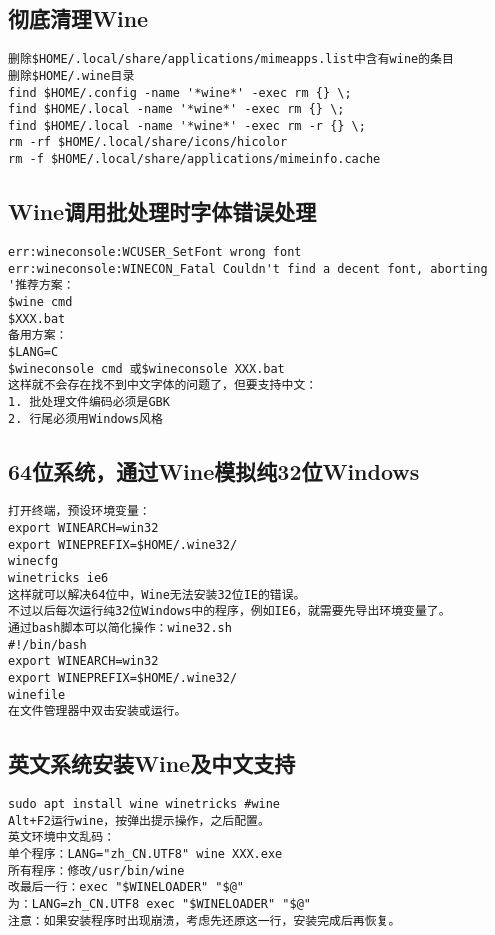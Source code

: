 \documentclass[a4paper,fontset=fandol,zihao=-4,linespread=1.2]{ctexbook}
\begin{document}
\subsection{彻底清理Wine}
\begin{lstlisting}
删除$HOME/.local/share/applications/mimeapps.list中含有wine的条目
删除$HOME/.wine目录
find $HOME/.config -name '*wine*' -exec rm {} \;
find $HOME/.local -name '*wine*' -exec rm {} \;
find $HOME/.local -name '*wine*' -exec rm -r {} \;
rm -rf $HOME/.local/share/icons/hicolor
rm -f $HOME/.local/share/applications/mimeinfo.cache
\end{lstlisting}

\subsection{Wine调用批处理时字体错误处理}
\begin{lstlisting}
err:wineconsole:WCUSER_SetFont wrong font
err:wineconsole:WINECON_Fatal Couldn't find a decent font, aborting
'推荐方案：
$wine cmd
$XXX.bat
备用方案：
$LANG=C
$wineconsole cmd 或$wineconsole XXX.bat
这样就不会存在找不到中文字体的问题了，但要支持中文：
1. 批处理文件编码必须是GBK
2. 行尾必须用Windows风格
\end{lstlisting}

\subsection{64位系统，通过Wine模拟纯32位Windows}
\begin{lstlisting}
打开终端，预设环境变量：
export WINEARCH=win32
export WINEPREFIX=$HOME/.wine32/
winecfg
winetricks ie6
这样就可以解决64位中，Wine无法安装32位IE的错误。
不过以后每次运行纯32位Windows中的程序，例如IE6，就需要先导出环境变量了。
通过bash脚本可以简化操作：wine32.sh
#!/bin/bash
export WINEARCH=win32
export WINEPREFIX=$HOME/.wine32/
winefile
在文件管理器中双击安装或运行。
\end{lstlisting}

\subsection{英文系统安装Wine及中文支持}
\begin{lstlisting}
sudo apt install wine winetricks #wine
Alt+F2运行wine，按弹出提示操作，之后配置。
英文环境中文乱码：
单个程序：LANG="zh_CN.UTF8" wine XXX.exe
所有程序：修改/usr/bin/wine
改最后一行：exec "$WINELOADER" "$@"
为：LANG=zh_CN.UTF8 exec "$WINELOADER" "$@"
注意：如果安装程序时出现崩溃，考虑先还原这一行，安装完成后再恢复。
\end{lstlisting}
\end{document}
